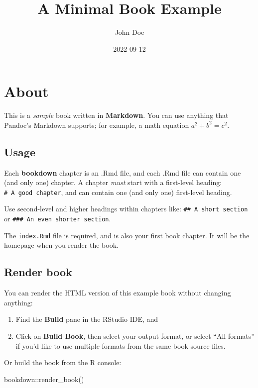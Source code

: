 \documentclass[
]{book}
\title{A Minimal Book Example}
\author{John Doe}
\date{2022-09-12}
\newenvironment{Shaded}{\begin{snugshade}}{\end{snugshade}}
\newcommand{\FunctionTok}[1]{\textcolor[rgb]{0.00,0.00,0.00}{#1}}
\newcommand{\NormalTok}[1]{#1}
\newcommand{\SpecialCharTok}[1]{\textcolor[rgb]{0.00,0.00,0.00}{#1}}
\theoremstyle{definition}
\theoremstyle{definition}
\theoremstyle{definition}
\theoremstyle{definition}
\theoremstyle{remark}
\begin{document}
\maketitle

{
\setcounter{tocdepth}{1}
\tableofcontents
}
\hypertarget{about}{%
\chapter{About}\label{about}}

This is a \emph{sample} book written in \textbf{Markdown}. You can use anything that Pandoc's Markdown supports; for example, a math equation \(a^2 + b^2 = c^2\).

\hypertarget{usage}{%
\section{Usage}\label{usage}}

Each \textbf{bookdown} chapter is an .Rmd file, and each .Rmd file can contain one (and only one) chapter. A chapter \emph{must} start with a first-level heading: \texttt{\#\ A\ good\ chapter}, and can contain one (and only one) first-level heading.

Use second-level and higher headings within chapters like: \texttt{\#\#\ A\ short\ section} or \texttt{\#\#\#\ An\ even\ shorter\ section}.

The \texttt{index.Rmd} file is required, and is also your first book chapter. It will be the homepage when you render the book.

\hypertarget{render-book}{%
\section{Render book}\label{render-book}}

You can render the HTML version of this example book without changing anything:

\begin{enumerate}
\def\labelenumi{\arabic{enumi}.}
\item
  Find the \textbf{Build} pane in the RStudio IDE, and
\item
  Click on \textbf{Build Book}, then select your output format, or select ``All formats'' if you'd like to use multiple formats from the same book source files.
\end{enumerate}

Or build the book from the R console:

\begin{Shaded}
\begin{Highlighting}[]
\NormalTok{bookdown}\SpecialCharTok{::}\FunctionTok{render\_book}\NormalTok{()}
\end{Highlighting}
\end{Shaded}
\end{document}
